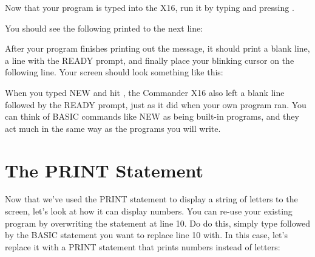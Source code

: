 Now that your program is typed into the X16, run it by typing
 and pressing \returnkey.

You should see the following printed to the next line:


After your program finishes printing out the message, it should print a blank
line, a line with the {\ttfamily READY} prompt, and finally place your blinking
cursor on the following line.  Your screen should look something like this:\\

\begin{center}
\end{center}

When you typed {\ttfamily NEW} and hit \returnkey, the Commander X16 also left
a blank line followed by the {\ttfamily READY} prompt, just as it did when your
own program ran.  You can think of BASIC commands like {\ttfamily NEW} as being
built-in programs, and they act much in the same way as the programs you will
write.\\


\chapter*{The PRINT Statement}

Now that we've used the {\ttfamily PRINT} statement to display a string of
letters to the screen, let's look at how it can display numbers.  You can
re-use your existing program by overwriting the statement at line 10.  Do do
this, simply type {} followed by the BASIC statement you want to
replace line 10 with.  In this case, let's replace it with a {\ttfamily PRINT}
statement that prints numbers instead of letters:\\

